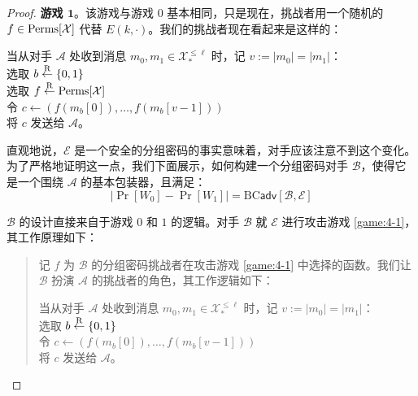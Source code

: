 \begin{proof}
\noindent
\textbf{游戏 $\mathbf{1}$}。该游戏与游戏 $0$ 基本相同，只是现在，挑战者用一个随机的 $f\in{\rm Perms}[\mathcal{X}]$ 代替 $E(k,\cdot)$。我们的挑战者现在看起来是这样的：

\vspace*{10pt}

\hspace*{5pt} 当从对手 $\mathcal{A}$ 处收到消息 $m_0,m_1\in\mathcal{X}_*^{\leq\ell}$ 时，记 $v:=|m_0|=|m_1|$：\\
\hspace*{50pt} 选取 $b\overset{\rm R}\leftarrow\{0,1\}$\\
\hspace*{50pt} 选取 $f\overset{\rm R}\leftarrow{\rm Perms}[\mathcal{X}]$\\
\hspace*{50pt} 令 $c\leftarrow(f(m_b[0]),\dots,f(m_b[v-1]))$\\
\hspace*{50pt} 将 $c$ 发送给 $\mathcal{A}$。

\vspace*{10pt}

直观地说，$\mathcal{E}$ 是一个安全的分组密码的事实意味着，对手应该注意不到这个变化。为了严格地证明这一点，我们下面展示，如何构建一个分组密码对手 $\mathcal{B}$，使得它是一个围绕 $\mathcal{A}$ 的基本包装器，且满足：
\begin{equation}\label{eq:4-6}
\big\lvert
\Pr[W_0]-\Pr[W_1]
\big\rvert
=\mathrm{BC}\mathsf{adv}[\mathcal{B},\mathcal{E}]
\end{equation}

$\mathcal{B}$ 的设计直接来自于游戏 $0$ 和 $1$ 的逻辑。对手 $\mathcal{B}$ 就 $\mathcal{E}$ 进行攻击游戏 \ref{game:4-1}，其工作原理如下：
\begin{quote}
记 $f$ 为 $\mathcal{B}$ 的分组密码挑战者在攻击游戏 \ref{game:4-1} 中选择的函数。我们让 $\mathcal{B}$ 扮演 $\mathcal{A}$ 的挑战者的角色，其工作逻辑如下：

\vspace*{5pt}

\hspace*{20pt} 当从对手 $\mathcal{A}$ 处收到消息 $m_0,m_1\in\mathcal{X}_*^{\leq\ell}$ 时，记 $v:=|m_0|=|m_1|$：\\
\hspace*{50pt} 选取 $b\overset{\rm R}\leftarrow\{0,1\}$\\
\hspace*{50pt} 令 $c\leftarrow(f(m_b[0]),\dots,f(m_b[v-1]))$\\
\hspace*{50pt} 将 $c$ 发送给 $\mathcal{A}$。


\end{quote}
\end{proof}
